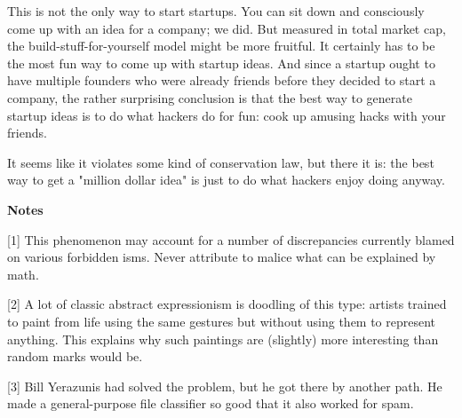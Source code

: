This is not the only way to start
                    startups. You can sit down and consciously come up with an
                    idea for a company; we did. But measured in total market
                    cap, the build-stuff-for-yourself model might be more
                    fruitful. It certainly has to be the most fun way to come up
                    with startup ideas. And since a startup ought to have
                    multiple founders who were already friends before they
                    decided to start a company, the rather surprising conclusion
                    is that the best way to generate startup ideas is to do what
                    hackers do for fun: cook up amusing hacks with your
                    friends.

It seems like it violates some kind of
                    conservation law, but there it is: the best way to get a
                    "million dollar idea" is just to do what hackers enjoy doing
                    anyway.




                    \textbf{Notes}

[1] This phenomenon may account for a number of discrepancies
                    currently blamed on various forbidden isms. Never attribute
                    to malice what can be explained by math.

[2] A lot of classic abstract expressionism is doodling of
                    this type: artists trained to paint from life using the same
                    gestures but without using them to represent anything. This
                    explains why such paintings are (slightly) more interesting
                    than random marks would be.

[3] Bill Yerazunis had solved the problem, but he got there
                    by another path. He made a general-purpose file classifier
                    so good that it also worked for spam.



              
            
          
          

          
            
              
            
            
              
                
                  
                
              
